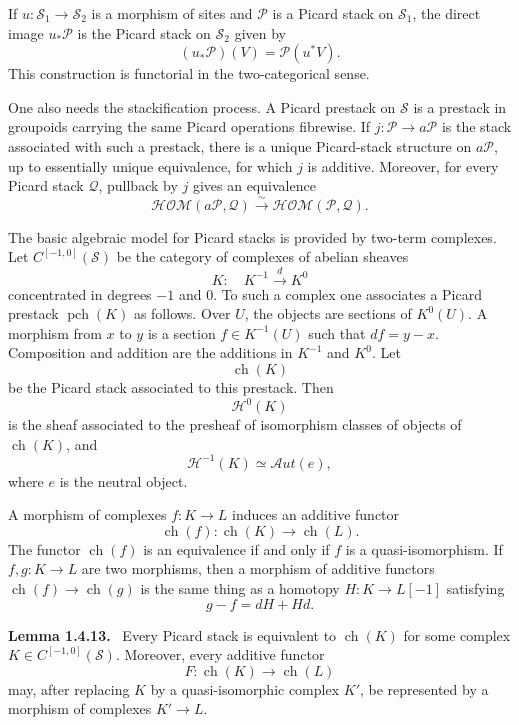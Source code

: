 \documentclass[12pt]{article}
\newcommand{\Ss}{\mathcal S}
\newcommand{\Pp}{\mathcal P}
\newcommand{\Qq}{\mathcal Q}
\newenvironment{statement}[1]{\par\medskip\noindent\textbf{#1.}\ }{\par\medskip}
\begin{document}
If \(u:\Ss_1\to\Ss_2\) is a morphism of sites and \(\Pp\) is a Picard stack on \(\Ss_1\), the direct image \(u_*\Pp\) is the Picard stack on \(\Ss_2\) given by
\[
(u_*\Pp)(V)=\Pp(u^*V).
\]
This construction is functorial in the two-categorical sense.

One also needs the stackification process. A Picard prestack on \(\Ss\) is a prestack in groupoids carrying the same Picard operations fibrewise. If \(j:\Pp\to a\Pp\) is the stack associated with such a prestack, there is a unique Picard-stack structure on \(a\Pp\), up to essentially unique equivalence, for which \(j\) is additive. Moreover, for every Picard stack \(\Qq\), pullback by \(j\) gives an equivalence
\[
\mathcal{HOM}(a\Pp,\Qq)
\xrightarrow{\sim}
\mathcal{HOM}(\Pp,\Qq).
\tag{1.4.10.1}
\]

The basic algebraic model for Picard stacks is provided by two-term complexes. Let \(C^{[-1,0]}(\Ss)\) be the category of complexes of abelian sheaves
\[
K:\quad K^{-1}\xrightarrow{d}K^0
\]
concentrated in degrees \(-1\) and \(0\). To such a complex one associates a Picard prestack \(\operatorname{pch}(K)\) as follows. Over \(U\), the objects are sections of \(K^0(U)\). A morphism from \(x\) to \(y\) is a section \(f\in K^{-1}(U)\) such that \(df=y-x\). Composition and addition are the additions in \(K^{-1}\) and \(K^0\). Let
\[
\operatorname{ch}(K)
\]
be the Picard stack associated to this prestack. Then
\[
\mathcal H^0(K)
\]
is the sheaf associated to the presheaf of isomorphism classes of objects of \(\operatorname{ch}(K)\), and
\[
\mathcal H^{-1}(K)\simeq\mathcal A ut(e),
\]
where \(e\) is the neutral object.

A morphism of complexes \(f:K\to L\) induces an additive functor
\[
\operatorname{ch}(f):\operatorname{ch}(K)\to\operatorname{ch}(L).
\]
The functor \(\operatorname{ch}(f)\) is an equivalence if and only if \(f\) is a quasi-isomorphism. If \(f,g:K\to L\) are two morphisms, then a morphism of additive functors \(\operatorname{ch}(f)\to\operatorname{ch}(g)\) is the same thing as a homotopy \(H:K\to L[-1]\) satisfying
\[
g-f=dH+Hd.
\tag{1.4.12.4}
\]

\begin{statement}{Lemma 1.4.13}
Every Picard stack is equivalent to \(\operatorname{ch}(K)\) for some complex \(K\in C^{[-1,0]}(\Ss)\). Moreover, every additive functor
\[
F:\operatorname{ch}(K)\to\operatorname{ch}(L)
\]
may, after replacing \(K\) by a quasi-isomorphic complex \(K'\), be represented by a morphism of complexes \(K'\to L\).
\end{statement}
\end{document}

